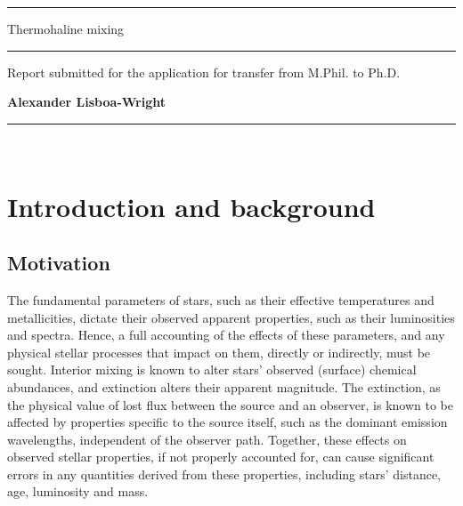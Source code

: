 \documentclass[12pt, a4paper]{report}
\begin{document}
\begin{titlepage}

\vspace*{-0.4cm}

\begin{center}
\hrule
\vspace*{0.5cm}
{\Huge \sc Thermohaline mixing \par}
\vspace*{0.5cm}
\hrule

\vspace*{5mm}
{\normalsize Report submitted for the application for transfer from M.Phil. to Ph.D.}

\vfill

{\bf Alexander Lisboa-Wright}

\end{center}

\vspace*{1.0cm}

\hrule
\vspace*{0.2cm}
\\

\end{titlepage}

\begin{abstract}
The abstract of the paper.
\end{abstract}

\chapter{Introduction and background}
\section{Motivation}
The fundamental parameters of stars, such as their effective temperatures and metallicities, dictate their observed apparent properties, such as their luminosities and spectra. Hence, a full accounting of the effects of these parameters, and any physical stellar processes that impact on them, directly or indirectly, must be sought. Interior mixing is known to alter stars' observed (surface) chemical abundances, and extinction alters their apparent magnitude. The extinction, as the physical value of lost flux between the source and an observer, is known to be affected by properties specific to the source itself, such as the dominant emission wavelengths, independent of the observer path.
Together, these effects on observed stellar properties, if not properly accounted for, can cause significant errors in any quantities derived from these properties, including stars' distance, age, luminosity and mass. 
\end{document}
